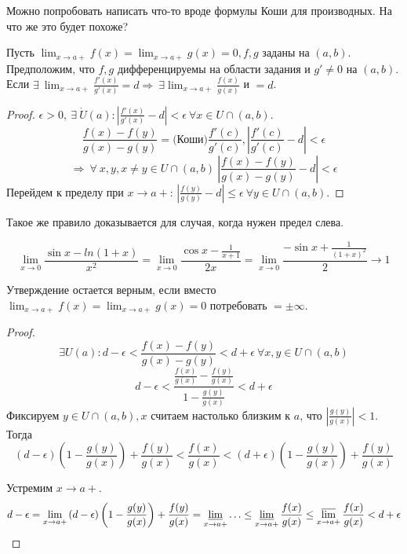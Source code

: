 \documentclass[12pt]{report}
\begin{document}
\begin{rem}
Можно попробовать написать что-то вроде формулы Коши для производных. На что же это будет похоже?
\end{rem}

\begin{st}
Пусть $\lim_{x \to a+}{f(x)} = \lim_{x \to a+}{g(x)} = 0, f, g$ заданы на $(a, b)$. Предположим, что $f, g$ дифференцируемы на области задания и $g' \neq 0$ на $(a, b)$. Если $\exists ~\lim_{x \to a+}{\frac{f'(x)}{g'(x)}} = d \Rightarrow ~\exists \lim_{x \to a+}{\frac{f(x)}{g(x)}}$ и $ = d$.
\end{st}
\begin{proof}
$\epsilon > 0, ~\exists ~\dot U(a): \left|\frac{f'(x)}{g'(x)} - d\right| < \epsilon ~\forall x \in U \cap (a, b)$. 
$$\frac{f(x) - f(y)}{g(x) - g(y)} = \mbox{(Коши)} \frac{f'(c)}{g'(c)}, \left|\frac{f'(c)}{g'(c)} - d\right| < \epsilon$$
$$\Rightarrow ~\forall ~x, y, x \neq y \in U \cap (a, b) ~\left|\frac{f(x) - f(y)}{g(x) - g(y)} - d \right| < \epsilon$$
Перейдем к пределу при $x \to a+$: $\left|\frac{f(y)}{g(y)} - d \right| \le \epsilon ~\forall y \in U \cap (a, b)$.
\end{proof}

\begin{note}
Такое же правило доказывается для случая, когда нужен предел слева.
\end{note}

\begin{ex}
$$\lim_{x \to 0}{\frac{\sin{x} - ln(1 + x)}{x^2}} = \lim_{x \to 0}{\frac{\cos{x} - \frac{1}{x + 1}}{2x}} = \lim_{x \to 0}{\frac{-\sin{x} + \frac{1}{(1 + x)^2}}{2}} \to 1$$
\end{ex}

\begin{st}[Дополнение]
Утверждение остается верным, если вместо $\lim_{x \to a+}{f(x)} = \lim_{x \to a+}{g(x)} = 0$ потребовать $ = \pm\infty$.
\end{st}
\begin{proof}
$$\exists U(a): d - \epsilon < \frac{f(x) - f(y)}{g(x) - g(y)} < d + \epsilon ~\forall x, y \in U \cap (a, b)$$
$$d - \epsilon < \frac{\frac{f(x)}{g(x)} - \frac{f(y)}{g(x)}}{1 - \frac{g(y)}{g(x)}} < d + \epsilon$$
Фиксируем $y \in U \cap (a, b), x$ считаем настолько близким к $a$, что $\left|\frac{g(y)}{g(x)}\right| < 1$. Тогда 
$$(d - \epsilon)\left(1 - \frac{g(y)}{g(x)}\right) + \frac{f(y)}{g(x)} < \frac{f(x)}{g(x)} < (d + \epsilon)\left(1 - \frac{g(y)}{g(x)}\right) + \frac{f(y)}{g(x)}$$

Устремим $x \to a+$. 
$$d - \epsilon = \lim_{x \to a+}{(d - \epsilon)\left(1 - \frac{g(y)}{g(x)}\right) + \frac{f(y)}{g(x)}} = \varliminf_{x \to a+}{\dots} \le \varliminf_{x \to a+}{\frac{f(x)}{g(x)}} \le \varlimsup_{x \to a+}{\frac{f(x)}{g(x)}} < d + \epsilon$$
\end{proof}
\end{document}
